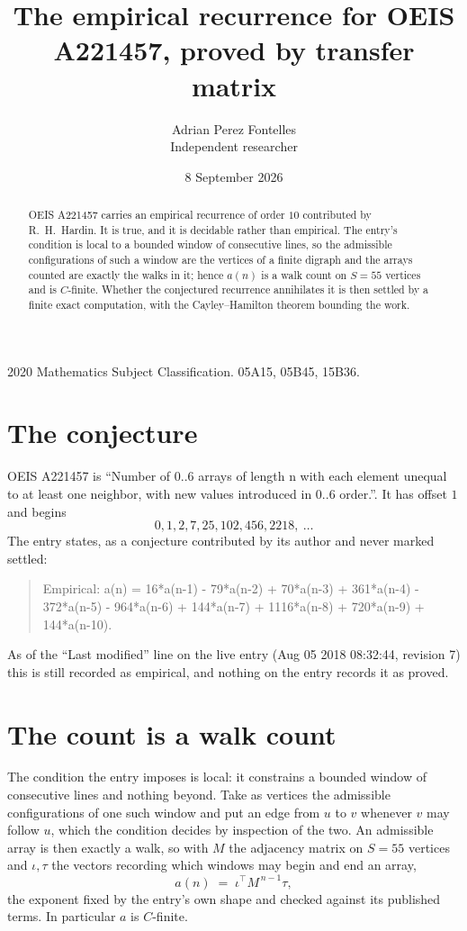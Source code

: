 \documentclass[11pt,a4paper]{article}
\title{The empirical recurrence for OEIS A221457, proved by transfer matrix}
\author{Adrian Perez Fontelles\\ \small Independent researcher}
\date{8 September 2026}
\theoremstyle{plain}
\theoremstyle{definition}
\begin{document}
\maketitle

\begin{abstract}
OEIS A221457 carries an empirical recurrence of order $10$ contributed by R.~H.~Hardin. It is
true, and it is decidable rather than empirical. The entry's condition is local to a bounded window of consecutive lines, so
the admissible configurations of such a window are the vertices of a finite digraph and the
arrays counted are exactly the walks in it; hence $a(n)$ is a walk count on $S=55$ vertices
and is $C$-finite. Whether the conjectured recurrence annihilates it is then settled by a
finite exact computation, with the Cayley--Hamilton theorem bounding the work.
\end{abstract}

\noindent\small 2020 Mathematics Subject Classification. 05A15, 05B45, 15B36.\normalsize

\section{The conjecture}

OEIS A221457 is ``Number of 0..6 arrays of length n with each element unequal to at least one neighbor, with new values introduced in 0..6 order.''. It has offset $1$ and begins
\[
0, 1, 2, 7, 25, 102, 456, 2218,\ \dots
\]
The entry states, as a conjecture contributed by its author and never marked settled:
\begin{quote}
Empirical: a(n) = 16*a(n-1) - 79*a(n-2) + 70*a(n-3) + 361*a(n-4) - 372*a(n-5) - 964*a(n-6) + 144*a(n-7) + 1116*a(n-8) + 720*a(n-9) + 144*a(n-10).
\end{quote}
As of the ``Last modified'' line on the live entry (Aug 05 2018 08:32:44, revision 7) this is still
recorded as empirical, and nothing on the entry records it as proved.

\section{The count is a walk count}

The condition the entry imposes is local: it constrains a bounded window of consecutive lines and nothing beyond. Take as
vertices the admissible configurations of one such window and put an edge from $u$ to $v$
whenever $v$ may follow $u$, which the condition decides by inspection of the two. An
admissible array is then exactly a walk, so with $M$ the adjacency matrix on $S=55$ vertices
and $\iota,\tau$ the vectors recording which windows may begin and end an array,
\[
a(n)\;=\;\iota^{\!\top}M^{\,n-1}\tau ,
\]
the exponent fixed by the entry's own shape and checked against its published terms. In
particular $a$ is $C$-finite.
\end{document}
